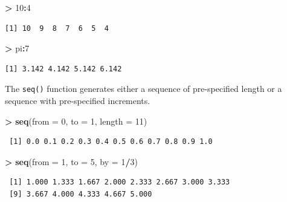 \documentclass[
]{krantz}
\makeatletter
\newenvironment{Shaded}{\begin{snugshade}}{\end{snugshade}}
\newcommand{\DataTypeTok}[1]{\textcolor[rgb]{0.27,0.27,0.27}{#1}}
\newcommand{\DecValTok}[1]{\textcolor[rgb]{0.06,0.06,0.06}{#1}}
\newcommand{\KeywordTok}[1]{\textcolor[rgb]{0.27,0.27,0.27}{\textbf{#1}}}
\newcommand{\NormalTok}[1]{#1}
\newcommand{\OperatorTok}[1]{\textcolor[rgb]{0.43,0.43,0.43}{\textbf{#1}}}
\newcommand{\StringTok}[1]{\textcolor[rgb]{0.5,0.5,0.5}{#1}}
\newenvironment{kframe}{%
\medskip{}
\setlength{\fboxsep}{.8em}
 \def\at@end@of@kframe{}%
 \ifinner\ifhmode%
  \def\at@end@of@kframe{\end{minipage}}%
  \begin{minipage}{\columnwidth}%
 \fi\fi%
 \def\FrameCommand##1{\hskip\@totalleftmargin \hskip-\fboxsep
 \colorbox{shadecolor}{##1}\hskip-\fboxsep
     \hskip-\linewidth \hskip-\@totalleftmargin \hskip\columnwidth}%
 \MakeFramed {\advance\hsize-\width
   \@totalleftmargin\z@ \linewidth\hsize
   \@setminipage}}%
 {\par\unskip\endMakeFramed%
 \at@end@of@kframe}
\renewenvironment{Shaded}{\begin{kframe}}{\end{kframe}}
\makeatother
\begin{document}
\begin{Shaded}
\begin{Highlighting}[]
\OperatorTok{\textgreater{}}\StringTok{ }\DecValTok{10}\OperatorTok{:}\DecValTok{4}
\end{Highlighting}
\end{Shaded}

\begin{verbatim}
[1] 10  9  8  7  6  5  4
\end{verbatim}

\begin{Shaded}
\begin{Highlighting}[]
\OperatorTok{\textgreater{}}\StringTok{ }\NormalTok{pi}\OperatorTok{:}\DecValTok{7}
\end{Highlighting}
\end{Shaded}

\begin{verbatim}
[1] 3.142 4.142 5.142 6.142
\end{verbatim}

The \texttt{seq()} function generates either a sequence of pre-specified length or a sequence with pre-specified increments.

\begin{Shaded}
\begin{Highlighting}[]
\OperatorTok{\textgreater{}}\StringTok{ }\KeywordTok{seq}\NormalTok{(}\DataTypeTok{from =} \DecValTok{0}\NormalTok{, }\DataTypeTok{to =} \DecValTok{1}\NormalTok{, }\DataTypeTok{length =} \DecValTok{11}\NormalTok{)}
\end{Highlighting}
\end{Shaded}

\begin{verbatim}
 [1] 0.0 0.1 0.2 0.3 0.4 0.5 0.6 0.7 0.8 0.9 1.0
\end{verbatim}

\begin{Shaded}
\begin{Highlighting}[]
\OperatorTok{\textgreater{}}\StringTok{ }\KeywordTok{seq}\NormalTok{(}\DataTypeTok{from =} \DecValTok{1}\NormalTok{, }\DataTypeTok{to =} \DecValTok{5}\NormalTok{, }\DataTypeTok{by =} \DecValTok{1}\OperatorTok{/}\DecValTok{3}\NormalTok{)}
\end{Highlighting}
\end{Shaded}

\begin{verbatim}
 [1] 1.000 1.333 1.667 2.000 2.333 2.667 3.000 3.333
 [9] 3.667 4.000 4.333 4.667 5.000
\end{verbatim}
\end{document}
